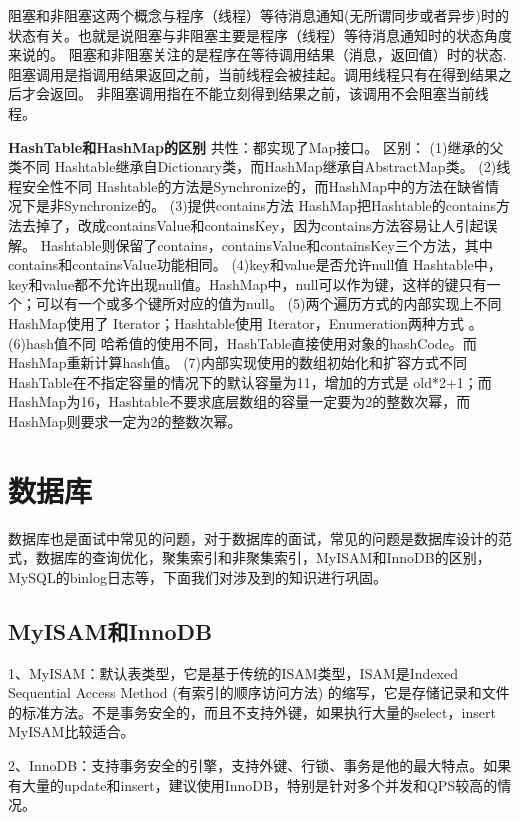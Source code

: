 \documentclass[UTF8]{ctexart}
\begin{document}
阻塞和非阻塞这两个概念与程序（线程）等待消息通知(无所谓同步或者异步)时的状态有关。也就是说阻塞与非阻塞主要是程序（线程）等待消息通知时的状态角度来说的。
阻塞和非阻塞关注的是程序在等待调用结果（消息，返回值）时的状态.
阻塞调用是指调用结果返回之前，当前线程会被挂起。调用线程只有在得到结果之后才会返回。
非阻塞调用指在不能立刻得到结果之前，该调用不会阻塞当前线程。



\textbf{HashTable和HashMap的区别}
共性：都实现了Map接口。
区别：
(1)继承的父类不同
Hashtable继承自Dictionary类，而HashMap继承自AbstractMap类。
(2)线程安全性不同
Hashtable的方法是Synchronize的，而HashMap中的方法在缺省情况下是非Synchronize的。
(3)提供contains方法
HashMap把Hashtable的contains方法去掉了，改成containsValue和containsKey，因为contains方法容易让人引起误解。
Hashtable则保留了contains，containsValue和containsKey三个方法，其中contains和containsValue功能相同。
(4)key和value是否允许null值
Hashtable中，key和value都不允许出现null值。HashMap中，null可以作为键，这样的键只有一个；可以有一个或多个键所对应的值为null。
(5)两个遍历方式的内部实现上不同
HashMap使用了 Iterator；Hashtable使用 Iterator，Enumeration两种方式 。
(6)hash值不同
哈希值的使用不同，HashTable直接使用对象的hashCode。而HashMap重新计算hash值。
(7)内部实现使用的数组初始化和扩容方式不同
HashTable在不指定容量的情况下的默认容量为11，增加的方式是 old*2+1；而HashMap为16，Hashtable不要求底层数组的容量一定要为2的整数次幂，而HashMap则要求一定为2的整数次幂。



\section{数据库}

数据库也是面试中常见的问题，对于数据库的面试，常见的问题是数据库设计的范式，数据库的查询优化，聚集索引和非聚集索引，MyISAM和InnoDB的区别，MySQL的binlog日志等，下面我们对涉及到的知识进行巩固。

\subsection{MyISAM和InnoDB}

1、MyISAM：默认表类型，它是基于传统的ISAM类型，ISAM是Indexed Sequential Access Method (有索引的顺序访问方法) 的缩写，它是存储记录和文件的标准方法。不是事务安全的，而且不支持外键，如果执行大量的select，insert MyISAM比较适合。

2、InnoDB：支持事务安全的引擎，支持外键、行锁、事务是他的最大特点。如果有大量的update和insert，建议使用InnoDB，特别是针对多个并发和QPS较高的情况。
\end{document}
